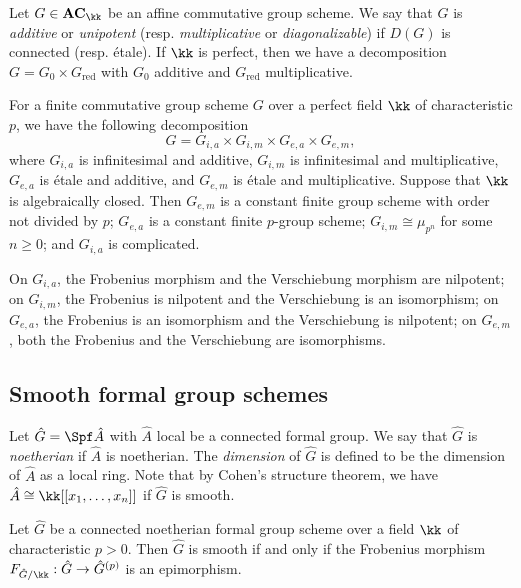 Let $G \in \mathbf{AC}_\kk$ be an affine commutative group scheme.
We say that $G$ is \emph{additive} or \emph{unipotent} (resp. \emph{multiplicative} or \emph{diagonalizable}) if $D(G)$ is connected (resp. \'etale).
If $\kk$ is perfect, then we have a decomposition $G = G_0 \times G_{\text{red}}$ with $G_0$ additive and $G_{\text{red}}$ multiplicative.

For a finite commutative group scheme $G$ over a perfect field $\kk$ of characteristic $p$, we have the following decomposition
\[ G = G_{i,a} \times G_{i,m} \times G_{e,a} \times G_{e,m}, \]
where $G_{i,a}$ is infinitesimal and additive, $G_{i,m}$ is infinitesimal and multiplicative, $G_{e,a}$ is \'etale and additive, and $G_{e,m}$ is \'etale and multiplicative.
Suppose that $\kk$ is algebraically closed.
Then $G_{e,m}$ is a constant finite group scheme with order not divided by $p$; $G_{e,a}$ is a constant finite $p$-group scheme; $G_{i,m} \cong \mu_{p^n}$ for some $n \ge 0$; and $G_{i,a}$ is complicated.

On $G_{i,a}$, the Frobenius morphism and the Verschiebung morphism are nilpotent;
on $G_{i,m}$, the Frobenius is nilpotent and the Verschiebung is an isomorphism;
on $G_{e,a}$, the Frobenius is an isomorphism and the Verschiebung is nilpotent;
on $G_{e,m}$, both the Frobenius and the Verschiebung are isomorphisms.


\subsection{Smooth formal group schemes}

Let $\hat{G} = \Spf \hat{A}$ with $\hat{A}$ local be a connected formal group.
We say that $\hat{G}$ is \emph{noetherian} if $\hat{A}$ is noetherian.
The \emph{dimension} of $\hat{G}$ is defined to be the dimension of $\hat{A}$ as a local ring.
Note that by Cohen's structure theorem, we have $\hat{A} \cong \kk[[x_1, \ldots, x_n]]$ if $\hat{G}$ is smooth.

\begin{proposition}
	Let $\hat{G}$ be a connected noetherian formal group scheme over a field $\kk$ of characteristic $p>0$.
	Then $\hat{G}$ is smooth if and only if the Frobenius morphism $F_{\hat{G}/\kk}: \hat{G} \to \hat{G}^{(p)}$ is an epimorphism.
\end{proposition}


































